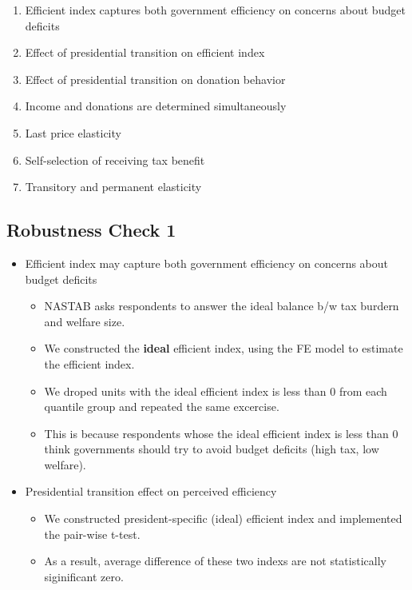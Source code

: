 \documentclass[ review  , 3p ]{elsarticle}
\providecommand{\tightlist}{%
  \setlength{\itemsep}{0pt}\setlength{\parskip}{0pt}}
\begin{document}
  \begin{enumerate}
  \def\labelenumi{\arabic{enumi}.}
  \tightlist
  \item
    Efficient index captures both government efficiency on concerns about budget deficits
  \item
    Effect of presidential transition on efficient index
  \item
    Effect of presidential transition on donation behavior
  \item
    Income and donations are determined simultaneously
  \item
    Last price elasticity
  \item
    Self-selection of receiving tax benefit
  \item
    Transitory and permanent elasticity
  \end{enumerate}

  \hypertarget{robustness-check-1-1}{%
  \subsection{Robustness Check 1}\label{robustness-check-1-1}}

  \begin{itemize}
  \tightlist
  \item
    Efficient index may capture both government efficiency on concerns about budget deficits

    \begin{itemize}
    \tightlist
    \item
      NASTAB asks respondents to answer the ideal balance b/w tax burdern and welfare size.
    \item
      We constructed the \textbf{ideal} efficient index, using the FE model to estimate the efficient index.
    \item
      We droped units with the ideal efficient index is less than 0 from each quantile group and repeated the same excercise.
    \item
      This is because respondents whose the ideal efficient index is less than 0 think governments should try to avoid budget deficits (high tax, low welfare).
    \end{itemize}
  \item
    Presidential transition effect on perceived efficiency

    \begin{itemize}
    \tightlist
    \item
      We constructed president-specific (ideal) efficient index and implemented the pair-wise t-test.
    \item
      As a result, average difference of these two indexs are not statistically siginificant zero.
    \end{itemize}
  \end{itemize}
\end{document}
